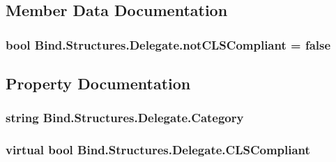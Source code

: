 \subsection{Member Data Documentation}
\hypertarget{class_bind_1_1_structures_1_1_delegate_af6d271c2e4161a6ea3061be6cfe17fcd}{
\subsubsection[{notCLSCompliant}]{\setlength{\rightskip}{0pt plus 5cm}bool {\bf Bind.Structures.Delegate.notCLSCompliant} = false}}
\label{class_bind_1_1_structures_1_1_delegate_af6d271c2e4161a6ea3061be6cfe17fcd}


\subsection{Property Documentation}
\hypertarget{class_bind_1_1_structures_1_1_delegate_a67d00dcb5bc415e28a4d4c6f48ae57a3}{
\subsubsection[{Category}]{\setlength{\rightskip}{0pt plus 5cm}string Bind.Structures.Delegate.Category}}
\label{class_bind_1_1_structures_1_1_delegate_a67d00dcb5bc415e28a4d4c6f48ae57a3}
\hypertarget{class_bind_1_1_structures_1_1_delegate_abf52ade2013e0401d4dc77df85f95085}{
\subsubsection[{CLSCompliant}]{\setlength{\rightskip}{0pt plus 5cm}virtual bool Bind.Structures.Delegate.CLSCompliant}}
\label{class_bind_1_1_structures_1_1_delegate_abf52ade2013e0401d4dc77df85f95085}


